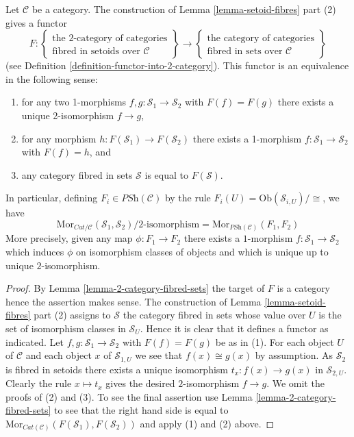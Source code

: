 \begin{lemma}
\label{lemma-2-category-fibred-setoids}
Let $\mathcal{C}$ be a category. The construction of
Lemma \ref{lemma-setoid-fibres}
part (2) gives a functor
$$
F :
\left\{
\begin{matrix}
\text{the 2-category of categories}\\
\text{fibred in setoids over }\mathcal{C}
\end{matrix}
\right\}
\longrightarrow
\left\{
\begin{matrix}
\text{the category of categories}\\
\text{fibred in sets over }\mathcal{C}
\end{matrix}
\right\}
$$
(see
Definition \ref{definition-functor-into-2-category}).
This functor is an equivalence in the following sense:
\begin{enumerate}
\item for any two 1-morphisms $f, g : \mathcal{S}_1 \to \mathcal{S}_2$
with $F(f) = F(g)$ there exists a unique 2-isomorphism $f \to g$,
\item for any morphism $h : F(\mathcal{S}_1) \to F(\mathcal{S}_2)$
there exists a 1-morphism $f : \mathcal{S}_1 \to \mathcal{S}_2$
with $F(f) = h$, and
\item any category fibred in sets $\mathcal{S}$ is equal to $F(\mathcal{S})$.
\end{enumerate}
In particular, defining $F_i \in \textit{PSh}(\mathcal{C})$ by the
rule $F_i(U) = \text{Ob}(\mathcal{S}_{i, U})/\cong$, we have
$$
\text{Mor}_{\textit{Cat}/\mathcal{C}}(\mathcal{S}_1, \mathcal{S}_2)
\Big/
2\text{-isomorphism}
=
\text{Mor}_{\textit{PSh}(\mathcal{C})}(F_1, F_2)
$$
More precisely, given any map $\phi : F_1 \to F_2$ there exists a
$1$-morphism $f : \mathcal{S}_1 \to \mathcal{S}_2$ which induces
$\phi$ on isomorphism classes of objects and
which is unique up to unique $2$-isomorphism.
\end{lemma}

\begin{proof}
By
Lemma \ref{lemma-2-category-fibred-sets}
the target of $F$ is a category hence the assertion makes sense.
The construction of
Lemma \ref{lemma-setoid-fibres} part (2)
assigns to $\mathcal{S}$ the category fibred in sets whose value over
$U$ is the set of isomorphism classes in $\mathcal{S}_U$. Hence it
is clear that it defines a functor as indicated.
Let $f, g : \mathcal{S}_1 \to \mathcal{S}_2$
with $F(f) = F(g)$ be as in (1). For each object $U$ of $\mathcal{C}$
and each object $x$ of $\mathcal{S}_{1, U}$ we see that $f(x) \cong g(x)$
by assumption. As $\mathcal{S}_2$ is fibred in setoids there exists
a unique isomorphism $t_x : f(x) \to g(x)$ in $\mathcal{S}_{2, U}$.
Clearly the rule $x \mapsto t_x$ gives the desired $2$-isomorphism
$f \to g$. We omit the proofs of (2) and (3).
To see the final assertion use
Lemma \ref{lemma-2-category-fibred-sets}
to see that the right hand side is equal to
$\text{Mor}_{\textit{Cat}(\mathcal{C})}(F(\mathcal{S}_1), F(\mathcal{S}_2))$
and apply (1) and (2) above.
\end{proof}

